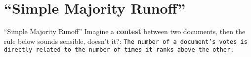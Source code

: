 \documentclass{beamer}
\begin{document}
        \section{``Simple Majority Runoff''}

        \begin{frame}{``Simple Majority Runoff''}
          Imagine a \textbf{contest} between two documents, then the rule below sounds sensible, doesn't it?: \newline \newline
          \texttt{The number of a document's votes is directly related to the number of times it ranks above the other.}
	\end{frame}
\end{document}
